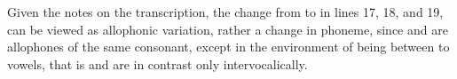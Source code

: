 \documentclass[12pt]{article}
\begin{document}
Given the notes on the transcription, the change from  to  in lines 17, 18, and 19, can be viewed as allophonic variation, rather a change in phoneme, since  and  are allophones of the same consonant, except in the environment of being between to vowels, that is  and  are in contrast only intervocalically.
\end{document}
